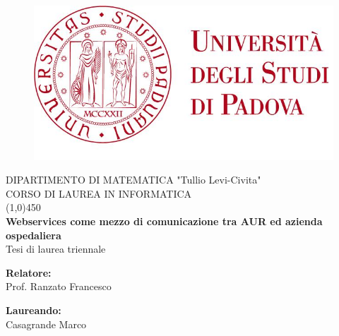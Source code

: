 \documentclass[a4paper]{article}
\begin{document}
\begin{titlepage}

\begin{figure}[H]
	\centering
	\includegraphics[width=\linewidth]{images/logounipd.jpg}
\end{figure}

\begin{center}
	\LARGE DIPARTIMENTO DI MATEMATICA "Tullio Levi-Civita" \\
    \vspace{5mm}
    \LARGE CORSO DI LAUREA IN INFORMATICA \\
	\vspace{8mm}
    \line(1,0){450} \\
    \vspace{10mm}
    \huge \textbf{Webservices come mezzo di comunicazione tra AUR ed azienda ospedaliera} \\
    \vspace{2mm}
    \LARGE Tesi di laurea triennale \\
\end{center}

\vspace{22mm}

\begin{minipage}[t]{0.50\textwidth}
	{\large{\bf Relatore:}\vspace{1mm} \\ Prof. Ranzato Francesco}
\end{minipage}
\hfill
\begin{minipage}[t]{0.50\textwidth}
	\raggedleft
	{\large{\bf Laureando:} \\ Casagrande Marco \\ }
\end{minipage}

\vspace*{\fill}


\end{titlepage}
\end{document}
